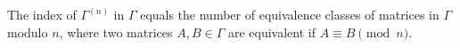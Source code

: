The index of $\Gamma^{(n)}$ in $\Gamma$ equals the number of equivalence classes of matrices in $\Gamma$ modulo $n$, where two matrices $A, B \in \Gamma$ are equivalent if $A \equiv B \pmod{n}$.

